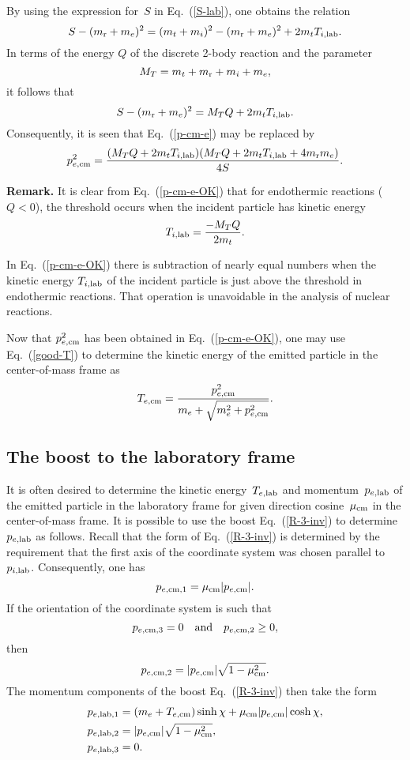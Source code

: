 {By using the expression for~$S$ in Eq.~(\ref{S-lab}), one
obtains the relation
$$
  S - (m_{\text{r}} + m_e)^2 =
  (m_t + m_i)^2 - (m_{\text{r}} + m_e)^2  + 2m_t T_{i,\textrm{lab}}.
$$
In terms of the energy $Q$ of the discrete 2-body reaction
and the parameter
\begin{equation}
  M_T = m_t + m_{\text{r}} + m_i + m_e,
 \label{def-M}
\end{equation}
it follows that
$$
    S - (m_{\text{r}} + m_e)^2 =
     M_T Q + 2m_t T_{i,\textrm{lab}}.
$$
Consequently, it is seen that Eq.~(\ref{p-cm-e}) may be
replaced by
\begin{equation}
  p_{e,\textrm{cm}}^2 = \frac{ (M_T Q +  2m_t T_{i,\textrm{lab}} )
                 ( M_T Q +  2m_t T_{i,\textrm{lab}} + 4m_{\text{r}} m_e)}
                {4 S }.
  \label{p-cm-e-OK}
\end{equation}

\textbf{Remark.}
It is clear from Eq.~(\ref{p-cm-e-OK}) that for endothermic
reactions ($Q < 0$), the threshold occurs when the incident
particle has kinetic energy
$$
  T_{i,\textrm{lab}} = \frac{-M_T Q}{2m_t}.
$$

In Eq.~(\ref{p-cm-e-OK}) there is subtraction of nearly equal
numbers when the kinetic energy $T_{i,\textrm{lab}}$ of the incident
particle is just above the threshold in endothermic reactions.
That operation is unavoidable in
the analysis of nuclear reactions. 

Now that $p_{e,\textrm{cm}}^2$ has been obtained in Eq.~(\ref{p-cm-e-OK}), one may use
Eq.~(\ref{good-T}) to determine the kinetic energy of the
emitted particle in the center-of-mass frame as
\begin{equation}
  T_{e,\textrm{cm}} = \frac{p_{e,\textrm{cm}}^2 }
          {m_e + \sqrt{ m_e^2 + p_{e,\textrm{cm}}^2 }}.
 \label{T-cm-e}
\end{equation}

\subsection{The boost to the laboratory frame}
It is often desired to determine the kinetic energy~$T_{e,\textrm{lab}}$
and momentum~$p_{e,\textrm{lab}}$ of the emitted particle in the laboratory frame
for given direction cosine~$\mu_{\text{cm}}$ in the center-of-mass frame.
It is possible to use the boost 
Eq.~(\ref{R-3-inv}) to determine $p_{e,\textrm{lab}}$ as follows.  Recall that
the form of Eq.~(\ref{R-3-inv}) is determined by the requirement that
the first axis of the coordinate system was chosen parallel to~$p_{i,\textrm{lab}}$.
Consequently, one has
$$
  p_{e,\textrm{cm},1} = \mu_{\text{cm}} |p_{e,\textrm{cm}}|.
$$
If the orientation of the coordinate system is such that
$$
  p_{e,\textrm{cm},3} = 0
  \quad \textrm{and} \quad
  p_{e,\textrm{cm},2} \ge 0,
$$
then
$$
  p_{e,\textrm{cm},2} =  |p_{e,\textrm{cm}}| \sqrt{ 1 - \mu_{\text{cm}}^2}.
$$
The momentum components of the boost Eq.~(\ref{R-3-inv}) then
take the form
\begin{equation*}
\begin{split}
  p_{e,\textrm{lab},1} &= (m_e + T_{e,\textrm{cm}})\sinh \chi +  \mu_{\text{cm}} |p_{e,\textrm{cm}}| \cosh \chi, \\
  p_{e,\textrm{lab},2} &= |p_{e,\textrm{cm}}| \sqrt{ 1 - \mu_{\text{cm}}^2}, \\
  p_{e,\textrm{lab},3} & = 0.\\
\end{split}
\end{equation*}

}
